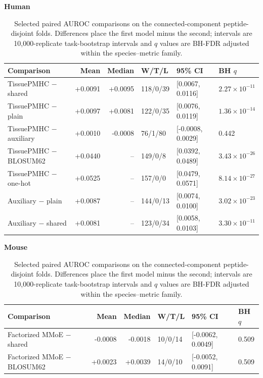 \begin{table}[htbp]
\centering
\caption{Selected paired AUROC comparisons on the connected-component peptide-disjoint folds. Differences place the first model minus the second; intervals are 10,000-replicate task-bootstrap intervals and \(q\) values are BH-FDR adjusted within the species--metric family.}
\label{tab:appendix-strict-paired}
\scriptsize
\setlength{\tabcolsep}{0.8pt}
\textbf{Human}\par\smallskip
\begin{tabular}{@{}lrrlll@{}}
\toprule
Comparison & Mean & Median & W/T/L & 95\% CI & BH \(q\) \\
\midrule
TissuePMHC $-$ shared & +0.0091 & +0.0095 & 118/0/39 & [0.0067, 0.0116] & $2.27\times10^{-11}$ \\
TissuePMHC $-$ plain & +0.0097 & +0.0081 & 122/0/35 & [0.0076, 0.0119] & $1.36\times10^{-14}$ \\
TissuePMHC $-$ auxiliary & +0.0010 & -0.0008 & 76/1/80 & [-0.0008, 0.0029] & 0.442 \\
TissuePMHC $-$ BLOSUM62 & +0.0440 & -- & 149/0/8 & [0.0392, 0.0489] & $3.43\times10^{-26}$ \\
TissuePMHC $-$ one-hot & +0.0525 & -- & 157/0/0 & [0.0479, 0.0571] & $8.14\times10^{-27}$ \\
Auxiliary $-$ plain & +0.0087 & -- & 144/0/13 & [0.0074, 0.0100] & $3.02\times10^{-23}$ \\
Auxiliary $-$ shared & +0.0081 & -- & 123/0/34 & [0.0058, 0.0103] & $3.30\times10^{-11}$ \\
\bottomrule
\end{tabular}
\par\medskip
\textbf{Mouse}\par\smallskip
\begin{tabular}{@{}lrrlll@{}}
\toprule
Comparison & Mean & Median & W/T/L & 95\% CI & BH \(q\) \\
\midrule
Factorized MMoE $-$ shared & -0.0008 & -0.0018 & 10/0/14 & [-0.0062, 0.0049] & 0.509 \\
Factorized MMoE $-$ BLOSUM62 & +0.0023 & +0.0039 & 14/0/10 & [-0.0052, 0.0091] & 0.509 \\
\bottomrule
\end{tabular}
\end{table}

